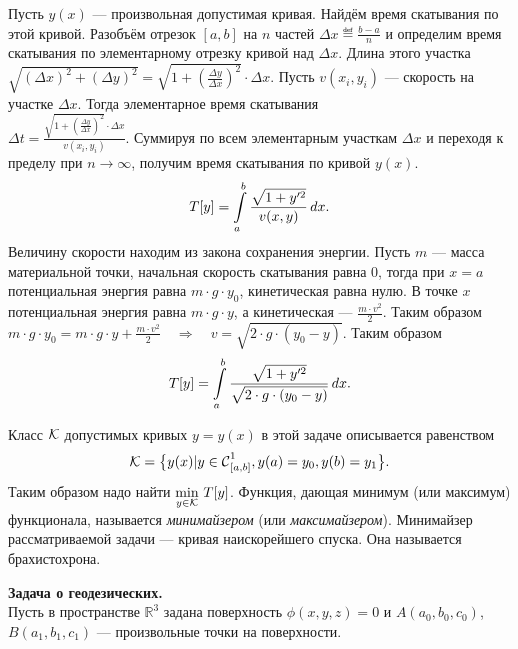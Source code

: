 \begin{enumerate2}
	Пусть $y(x)$ --- произвольная допустимая кривая. Найдём время скатывания по этой кривой. Разобъём отрезок ${[a,b]}$ на $n$ частей $\Delta x\eqdef\frac{b-a}{n}$ и определим время скатывания по элементарному отрезку кривой над $\Delta x$. Длина этого участка $\sqrt{(\Delta x)^2+(\Delta y)^2}=\sqrt{1+\left(\frac{\Delta y}{\Delta x}\right)^2}\cdot \Delta x$. Пусть $v(x_i, y_i)$ --- скорость на участке $\Delta x$. Тогда элементарное время скатывания \\
	$\Delta t= \displaystyle \frac{\sqrt{1+\left(\frac{\Delta y}{\Delta x}\right)^2}\cdot \Delta x}{v(x_i, y_i)}$. Суммируя по всем элементарным участкам $\Delta x$ и переходя к пределу при $n\to\infty$, получим время скатывания по кривой $y(x)$.
	\begin{equation*}
		\hfill T[y]=\int\limits_a^b\frac{\sqrt{1+y^{\prime 2}}}{v(x,y)}\,\dd{x}.\hfill
	\end{equation*}
	Величину скорости находим из закона сохранения энергии. Пусть $m$ --- масса материальной точки, начальная скорость скатывания равна 0, тогда при $x=a$ потенциальная энергия равна $m\cdot g\cdot y_0$, кинетическая равна нулю. В точке $x$ потенциальная энергия равна $m\cdot g\cdot y$, а кинетическая --- $\frac{m\cdot v^2}{2}$. Таким образом
	$m\cdot g\cdot y_0=m\cdot g\cdot y+\frac{m\cdot v^2}{2}\quad\Rightarrow \quad v=\sqrt{2\cdot g\cdot(y_0-y)}$. Таким образом  
	\begin{equation*}
		\hfill T[y]=\int\limits_a^b\frac{\sqrt{1+y^{\prime 2}}}{\sqrt{2\cdot g\cdot(y_0-y)}}\,\dd{x}.\hfill
	\end{equation*}
	
	Класс $\mathcal{K}$ допустимых кривых $y=y(x)$ в этой задаче описывается равенством 	
	\begin{equation*}
		\hfill\mc{K}=\big\{y(x)|y\in\Cfn[{[a,b]}]{1}, y(a)=y_0, y(b)=y_1\big\}.\hfill
	\end{equation*}
	Таким образом надо найти $\min\limits_{y\in\mathcal{K}}\,T[y]$. Функция, дающая минимум (или максимум) функционала, называется \emph{минимайзером} (или \emph{максимайзером}). Минимайзер рассматриваемой задачи --- кривая наискорейшего спуска. Она называется брахистохрона.
	
	\item \textbf{Задача о геодезических.}\\
	Пусть в пространстве $\mathbb{R}^3$ задана поверхность $\phi(x,y,z)=0$ и $A(a_0,b_0,c_0)$, $B(a_1,b_1,c_1)$ --- произвольные точки на поверхности.
	
	

\end{enumerate2}
